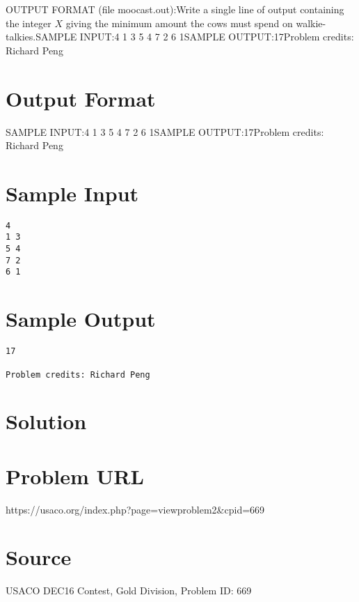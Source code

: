 \documentclass[12pt]{article}
\begin{document}
OUTPUT FORMAT (file moocast.out):Write a single line of output containing the integer $X$ giving the minimum
amount the cows must spend on walkie-talkies.SAMPLE INPUT:4
1 3
5 4
7 2
6 1SAMPLE OUTPUT:17Problem credits: Richard Peng

\section*{Output Format}
SAMPLE INPUT:4
1 3
5 4
7 2
6 1SAMPLE OUTPUT:17Problem credits: Richard Peng

\section*{Sample Input}
\begin{verbatim}
4
1 3
5 4
7 2
6 1
\end{verbatim}

\section*{Sample Output}
\begin{verbatim}
17

Problem credits: Richard Peng
\end{verbatim}

\section*{Solution}


\section*{Problem URL}
https://usaco.org/index.php?page=viewproblem2&cpid=669

\section*{Source}
USACO DEC16 Contest, Gold Division, Problem ID: 669
\end{document}

